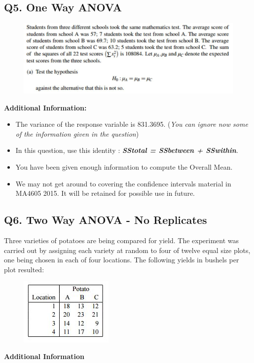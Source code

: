 \documentclass[a4paper,12pt]{article}
\begin{document}
\subsection*{Q5. One Way ANOVA }
\begin{figure}[h!]
	\centering
	\includegraphics[width=1\linewidth]{image/Q27review1}
	
\end{figure}
\noindent \textbf{Additional Information: }
\begin{itemize}
	\item The variance of the response variable is 831.3695. (\textit{You can ignore now some of the information given in the question}) 
	\item  In this question, use this identity : \textbf{\textit{SStotal = SSbetween + SSwithin}}.
	\item  You have been given enough information to compute the Overall Mean.
	\item  We may not get around to covering the confidence intervals material in MA4605 2015. It will be retained for possible use in future.
\end{itemize}
\newpage
\subsection*{Q6. Two Way ANOVA - No Replicates} %

Three varieties of potatoes are being compared for yield. The experiment
was carried out by assigning each variety at random to four of twelve equal size
plots, one being chosen in each of four locations. The following yields in bushels per 
plot resulted:

\begin{figure}[h!]
	\centering
	\includegraphics[width=0.4\linewidth]{image/twowayanova-potato}
\end{figure}
\noindent \textbf{Additional Information} 
\end{document}
